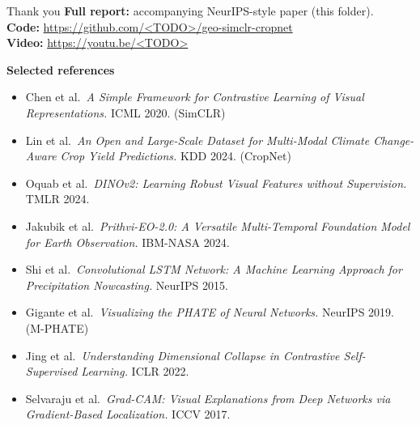 \documentclass[aspectratio=169,11pt]{beamer}
\begin{document}
\begin{frame}[plain]{Thank you  }
  \vspace{6pt}
  \footnotesize
  \textbf{Full report:} accompanying NeurIPS-style paper (this folder).\\
  \textbf{Code:} \url{https://github.com/<TODO>/geo-simclr-cropnet}\\
  \textbf{Video:} \url{https://youtu.be/<TODO>}

  \vspace{14pt}
  \textbf{Selected references}
  \scriptsize
  \begin{itemize}\setlength\itemsep{1pt}
    \item Chen et al.\ \textit{A Simple Framework for Contrastive Learning of
          Visual Representations.} ICML 2020. (SimCLR)
    \item Lin et al.\ \textit{An Open and Large-Scale Dataset for Multi-Modal
          Climate Change-Aware Crop Yield Predictions.} KDD 2024. (CropNet)
    \item Oquab et al.\ \textit{DINOv2: Learning Robust Visual Features
          without Supervision.} TMLR 2024.
    \item Jakubik et al.\ \textit{Prithvi-EO-2.0: A Versatile Multi-Temporal
          Foundation Model for Earth Observation.} IBM-NASA 2024.
    \item Shi et al.\ \textit{Convolutional LSTM Network: A Machine Learning
          Approach for Precipitation Nowcasting.} NeurIPS 2015.
    \item Gigante et al.\ \textit{Visualizing the PHATE of Neural Networks.}
          NeurIPS 2019. (M-PHATE)
    \item Jing et al.\ \textit{Understanding Dimensional Collapse in
          Contrastive Self-Supervised Learning.} ICLR 2022.
    \item Selvaraju et al.\ \textit{Grad-CAM: Visual Explanations from Deep
          Networks via Gradient-Based Localization.} ICCV 2017.
  \end{itemize}
\end{frame}
\end{document}
